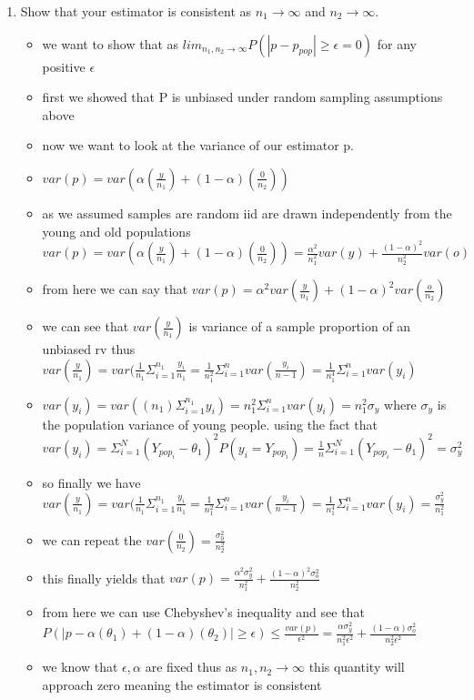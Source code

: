 \documentclass[12pt,twoside]{article}
\begin{document}
\begin{enumerate}
\begin{enumerate}
\item Show that your estimator is consistent as $n_1 \rightarrow \infty$ and  $n_2 \rightarrow \infty$.
\begin{itemize}
    \item we want to show that as $lim_{n_1,n_2\rightarrow \infty}P(|p-p_{pop}|\geq \epsilon=0) $ for any positive $\epsilon$
    \item first we showed that P is unbiased under random sampling assumptions above
    \item now we want to look at the variance of our estimator p.
    \item $var(p)=var(\alpha(\frac{y}{n_1})+(1-\alpha)(\frac{0}{n_2}))$ 
    \item  as we assumed samples are random iid are drawn independently from the young and old populations  $var(p)=var(\alpha(\frac{y}{n_1})+(1-\alpha)(\frac{0}{n_2}))=\frac{\alpha^2}{n_1^2}var(y)+\frac{(1-\alpha)^2}{n_2^2}var(o)$
    \item from here we can say that $var(p)={\alpha^2}var(\frac{y}{n_1})+(1-\alpha)^2var(\frac{o}{n_2})$ 
    \item we can see that $var(\frac{y}{n_1})$ is variance of a sample proportion of an unbiased rv thus $var(\frac{y}{n_1})=var(\frac{1}{n_1}\Sigma_{i=1}^{n_1}\frac{y_i}{n_1}=\frac{1}{n_1^2}\Sigma_{i=1}^{n}var(\frac{y_i}{n-1})=\frac{1}{n_1^{4}}\Sigma_{i=1}^{n}var({y_i})$
    \item $var(y_i)=var((n_1)\Sigma_{i=1}^{n_1}y_i)=n_1^{2}\Sigma_{i=1}^{n}var(y_i)=n_1^{2}\sigma_{y}$ where $\sigma_{y}$ is the population variance of young people. using the fact that $var(y_i)=\Sigma_{i=1}^{N}(Y_{pop_i}-\theta_1)^2P(y_i=Y_{pop_i})=\frac{1}{n}\Sigma_{i=1}^{N}(Y_{pop_i}-\theta_1)^2=\sigma_{y}^2$
    \item so finally we have $var(\frac{y}{n_1})=var(\frac{1}{n_1}\Sigma_{i=1}^{n_1}\frac{y_i}{n_1}=\frac{1}{n_1^2}\Sigma_{i=1}^{n}var(\frac{y_i}{n-1})=\frac{1}{n_1^{4}}\Sigma_{i=1}^{n}var({y_i})=\frac{\sigma_{y}^2}{n_1^2}$
    \item we can repeat the $var(\frac{0}{n_2})=\frac{\sigma_{0}^2}{n_2^2}$
    \item this finally yields that $var(p)=\frac{\alpha^2 \sigma_{y}^2}{n_1^{2}}+\frac{(1-\alpha)^2 \sigma_{o}^2}{n_2^{2}}$
    \item from here we can use Chebyshev's inequality and see that $P(|p-\alpha(\theta_1)+(1-\alpha)(\theta_2)|\geq  \epsilon)\leq \frac{var(p)}{\epsilon^2}=\frac{\alpha\sigma_{y}^2}{n_1^2 \epsilon^2}+\frac{(1-\alpha)\sigma_{o}^2}{n_2^2 \epsilon^2}$
    \item we know that $\epsilon, \alpha$ are fixed thus as $n_1,n_2\rightarrow \infty$ this quantity will approach zero meaning the estimator is consistent 
\end{itemize}



\end{enumerate}
\end{enumerate}
\end{document}
